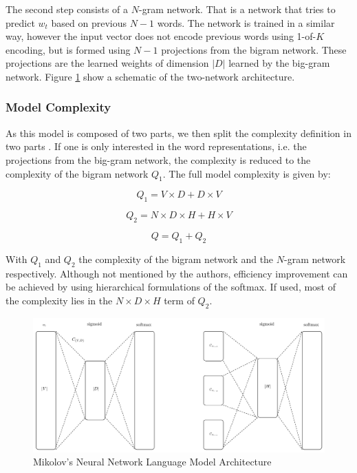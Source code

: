The second step consists of a  $N$-gram network. That is a network that tries to predict $w_t$ based on previous $N-1$ words. 
The network is trained in a 
similar way, however the input vector does not encode previous words using 1-of-$K$ encoding, but is formed using $N-1$ projections from
the  bigram network. These projections are the learned weights of dimension
$|D|$ learned by the big-gram network. Figure
\ref{fig:mikolov_nnlm_architecture} show a schematic of the two-network architecture.


\subsubsection{Model Complexity}

As this model is composed of two parts, we then split the complexity definition in two parts . If one is only interested in
the word representations, i.e. the projections from the big-gram network,  the
complexity is reduced to the complexity of the bigram network $Q_1$.  The full model
complexity is given by: 


\begin{equation} Q_1 = V \times D + D \times V  \end{equation}

\begin{equation} Q_2 =  N \times D \times H + H \times V   \end{equation}

\begin{equation} Q = Q_1 + Q_2
\end{equation}

With $Q_1$ and $Q_2$ the complexity of the bigram network and the $N$-gram
network respectively. Although not mentioned by the authors, efficiency
improvement can be achieved by using hierarchical formulations of the softmax. If used, most of the complexity  lies in the  $N \times D \times
H$ term of $Q_2$.

\begin{figure}[hptb!]
    \centering
    \includegraphics[width=1.0\textwidth]{images/mikolov-fnnl-latex.pdf} 
    \caption{Mikolov's Neural Network Language Model Architecture}
    \label{fig:mikolov_nnlm_architecture}
\end{figure}
  

